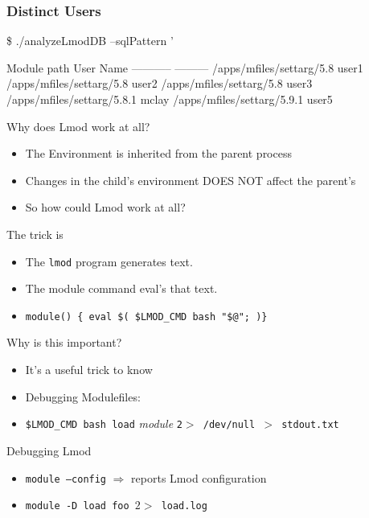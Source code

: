 \documentclass{beamer}
\begin{document}
\begin{frame}[fragile]
    \frametitle{Distinct Users}
  {\tiny
    \begin{semiverbatim}
\$ ./analyzeLmodDB --sqlPattern '%

Module path                   User Name
-----------                   ---------
/apps/mfiles/settarg/5.8      user1
/apps/mfiles/settarg/5.8      user2
/apps/mfiles/settarg/5.8      user3
/apps/mfiles/settarg/5.8.1    mclay
/apps/mfiles/settarg/5.9.1    user5
    \end{semiverbatim}
}
\end{frame}

\begin{frame}{Why does Lmod work at all?}
  \begin{itemize}
    \item The Environment is inherited from the parent process
    \item Changes in the child's environment DOES NOT affect the parent's
    \item So how could Lmod work at all? 
  \end{itemize}
\end{frame}

\begin{frame}{The trick is}
  \begin{itemize}
    \item The \texttt{lmod} program generates text.
    \item The module command eval's that text.
    \item \texttt{module() \{ eval \$( \$LMOD\_CMD bash "\$@"; )\}}
  \end{itemize}
\end{frame}

\begin{frame}{Why is this important?}
  \begin{itemize}
    \item It's a useful trick to know
    \item Debugging Modulefiles:
    \item \texttt{\$LMOD\_CMD bash load} \emph{module} \texttt{2$>$
        /dev/null $>$ stdout.txt}
  \end{itemize}
\end{frame}

\begin{frame}{Debugging Lmod}
  \begin{itemize}
    \item \texttt{module --config} $\Rightarrow$ reports Lmod configuration
    \item \texttt{module -D load foo $2>$ load.log}
  \end{itemize}
\end{frame}
\end{document}
